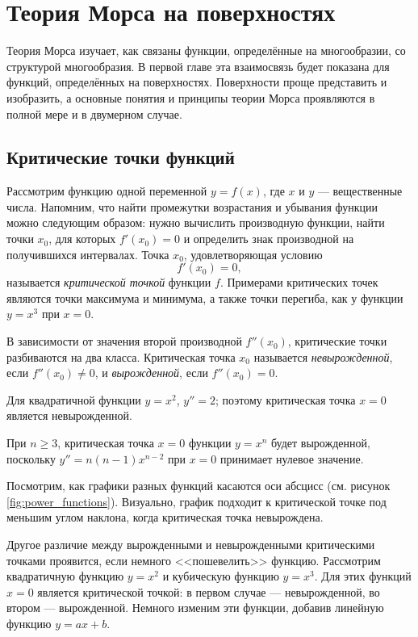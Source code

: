 \documentclass[a4paper,12pt,openany,leqno]{extbook}
\begin{document}
	\chapter{Теория Морса на поверхностях}
    
    Теория Морса изучает, как связаны функции, определённые на многообразии, со структурой многообразия. В первой главе эта взаимосвязь будет показана для функций, определённых на поверхностях. Поверхности проще представить и изобразить, а основные понятия и принципы теории Морса проявляются в полной мере и в двумерном случае.
    
    \section{Критические точки функций}
    Рассмотрим функцию одной переменной $y = f(x)$, где $x$ и $y$ --- вещественные числа. Напомним, что найти промежутки возрастания и убывания функции можно следующим образом: нужно вычислить производную функции, найти точки $x_0$, для которых $f'(x_0) = 0$ и определить знак производной на получившихся интервалах. Точка $x_0$, удовлетворяющая условию \[f'(x_0) = 0,\] называется \emph{критической точкой} функции $f$. Примерами критических точек являются точки максимума и минимума, а также точки перегиба, как у функции $y = x^3$ при $x = 0$.
    
    В зависимости от значения второй производной $f''(x_0)$, критические точки разбиваются на два класса. Критическая точка $x_0$ называется \emph{невырожденной}, если $f''(x_0) \neq 0$, и \emph{вырожденной}, если $f''(x_0) = 0$.
    
    \begin{example}
    Для квадратичной функции $y = x^2$, $y'' = 2$; поэтому критическая точка $x = 0$ является невырожденной.
    
    При $n \geq 3$, критическая точка $x = 0$ функции $y = x^n$ будет вырожденной, поскольку $y'' = n(n - 1)x^{n - 2}$ при $x = 0$ принимает нулевое значение.
    \end{example}
    
    Посмотрим, как графики разных функций касаются оси абсцисс (см. рисунок \ref{fig:power_functions}). Визуально, график подходит к критической точке под меньшим углом наклона, когда критическая точка невырождена.
    
    Другое различие между вырожденными и невырожденными критическими точками проявится, если немного <<пошевелить>> функцию. Рассмотрим квадратичную функцию $y = x^2$ и кубическую функцию $y = x^3$. Для этих функций $x = 0$ является критической точкой: в первом случае --- невырожденной, во втором --- вырожденной. Немного изменим эти функции, добавив линейную функцию $y = ax + b$.
    
\end{document}
